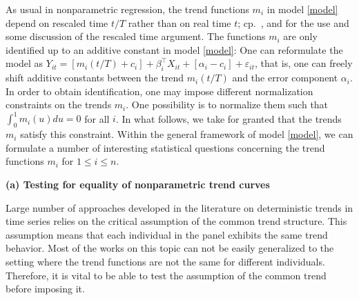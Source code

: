 \documentclass[a4paper,12pt]{article}
\begin{document}
As usual in nonparametric regression, the trend functions $m_i$ in model \eqref{model} depend on rescaled time $t/T$ rather than on real time $t$; cp.\ \cite{Robinson1989}, \cite{Dahlhaus1997} and \cite{VogtLinton2014} for the use and some discussion of the rescaled time argument. The functions $m_i$ are only identified up to an additive constant in model \eqref{model}: One can reformulate the model as $Y_{it} = [m_i(t/T) + c_i] + \beta_i^\top X_{it} + [\alpha_i - c_i] + \varepsilon_{it}$, that is, one can freely shift additive constants between the trend $m_i(t/T)$ and the error component $\alpha_i$. In order to obtain identification, one may impose different normalization constraints on the trends $m_i$. One possibility is to normalize them such that $\int_0^1 m_i(u) du = 0$ for all $i$. In what follows, we take for granted that the trends $m_i$ satisfy this constraint. 
Within the general framework of model \eqref{model}, we can formulate a number of interesting statistical questions concerning the trend functions $m_i$ for $1 \le i \le n$. 
\vspace{10pt}

\noindent \textbf{(a) Testing for equality of nonparametric trend curves } 
\vspace{10pt} 

 
\noindent Large number of approaches developed in the literature on deterministic trends in time series relies on the critical assumption of the common trend structure. This assumption means that each individual in the panel exhibits the same trend behavior. Most of the works on this topic can not be easily generalized to the setting where the trend functions are not the same for different individuals. Therefore, it is vital to be able to test the assumption of the common trend before imposing it. 
\end{document}
